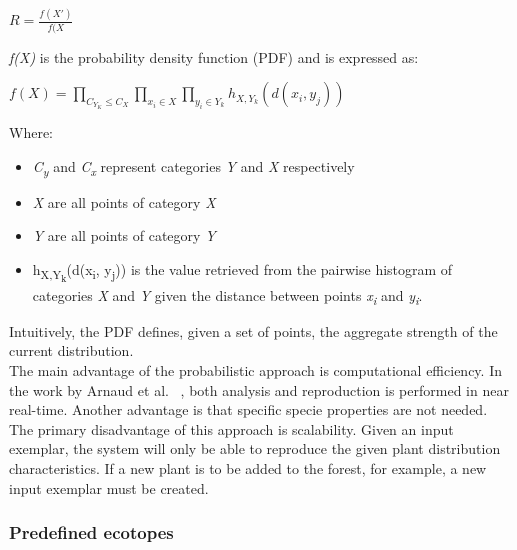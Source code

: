 \begin{center}
$ R = \frac{f(X')}{f(X}$
\end{center}
\textit{f(X)} is the probability density function (PDF) and is expressed as:\\

\begin{center}
$ f(X) = \prod_{C_{Y_{K}} \leq C_{X}} 
		 \prod_{x_{i} \in X}
		 \prod_{y_{i} \in Y_{k}} 
		 h_{X,Y_{k}}(d(x_{i},y_{j}))$
\end{center} 

Where:
\begin{itemize}
\item \textit{C\textsubscript{y}} and \textit{C\textsubscript{x}} represent categories \textit{Y} and \textit{X} respectively
\item \textit{X} are all points of category \textit{X}
\item \textit{Y} are all points of category \textit{Y}
\item h\textsubscript{X,Y\textsubscript{k}}(d(x\textsubscript{i}, y\textsubscript{j})) is the value retrieved from the pairwise histogram of categories \textit{X} and \textit{Y} given the distance between points \textit{x\textsubscript{i}} and \textit{y\textsubscript{i}}.
\end{itemize}
Intuitively, the PDF defines, given a set of points, the aggregate strength of the current distribution.\\

The main advantage of the probabilistic approach is computational efficiency. In the work by Arnaud et al. ~\cite{Emilien}, both analysis and reproduction is performed in near real-time. Another advantage is that specific specie properties are not needed. \\
The primary disadvantage of this approach is scalability. Given an input exemplar, the system will only be able to reproduce the given plant distribution characteristics. If a new plant is to be added to the forest, for example, a new input exemplar must be created. 

\subsubsection{Predefined ecotopes}
